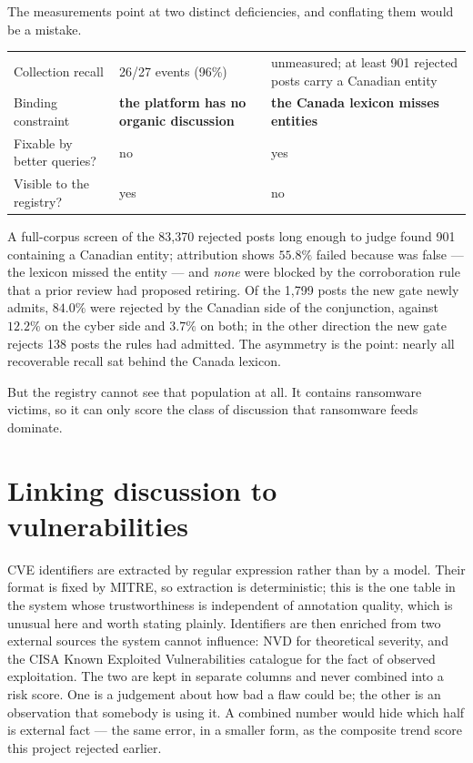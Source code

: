 \documentclass[11pt]{article}
\begin{document}
The measurements point at two distinct deficiencies, and conflating them would
be a mistake.

\begin{center}
\begin{tabularx}{\linewidth}{@{}Lp{4.4cm}p{4.4cm}@{}}
\toprule
 &  &  \\
\midrule
Collection recall & 26/27 events (96\%) & unmeasured; at least 901 rejected
posts carry a Canadian entity \\
Binding constraint & \textbf{the platform has no organic discussion} &
\textbf{the Canada lexicon misses entities} \\
Fixable by better queries? & no & yes \\
Visible to the registry? & yes & no \\
\bottomrule
\end{tabularx}
\end{center}

\medskip

A full-corpus screen of the 83{,}370 rejected posts long enough to judge found
901 containing a Canadian entity; attribution shows $55.8\%$ failed because
 was false --- the lexicon missed the entity --- and
\emph{none} were blocked by the corroboration rule that a prior review had
proposed retiring. Of the 1{,}799 posts the new gate newly admits, $84.0\%$
were rejected by the Canadian side of the conjunction, against $12.2\%$ on the
cyber side and $3.7\%$ on both; in the other direction the new gate rejects 138
posts the rules had admitted. The asymmetry is the point: nearly all
recoverable recall sat behind the Canada lexicon.

But the registry cannot see that population at all. It contains ransomware
victims, so it can only score the class of discussion that ransomware feeds
dominate.

\section{Linking discussion to vulnerabilities}

CVE identifiers are extracted by regular expression rather than by a model.
Their format is fixed by MITRE, so extraction is deterministic; this is the one
table in the system whose trustworthiness is independent of annotation quality,
which is unusual here and worth stating plainly. Identifiers are then enriched
from two external sources the system cannot influence: NVD for theoretical
severity, and the CISA Known Exploited Vulnerabilities catalogue for the fact
of observed exploitation. The two are kept in separate columns and never
combined into a risk score. One is a judgement about how bad a flaw could be;
the other is an observation that somebody is using it. A combined number would
hide which half is external fact --- the same error, in a smaller form, as the
composite trend score this project rejected earlier.
\end{document}
